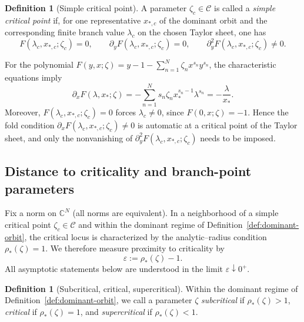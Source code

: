 \documentclass[11pt]{amsart}
\numberwithin{equation}{section}
\theoremstyle{plain}
\theoremstyle{definition}
\newtheorem{definition}[theorem]{Definition}
\theoremstyle{remark}
\newcommand{\CC}{\mathbb{C}}
\begin{document}
\begin{definition}[Simple critical point]\label{def:simple-critical}
	A parameter $\zeta_c\in\mathcal C$ is called a \emph{simple critical point}
	if, for one representative $x_{*,c}$ of the dominant
	orbit and the corresponding finite branch value $\lambda_c$ on the chosen Taylor
	sheet, one has
	\[
		F(\lambda_c,x_{*,c};\zeta_c)=0,
		\qquad
		\partial_yF(\lambda_c,x_{*,c};\zeta_c)=0,
		\qquad
		\partial_y^2F(\lambda_c,x_{*,c};\zeta_c)\neq0.
	\]
\end{definition}

For the polynomial $F(y,x;\zeta)=y-1-\sum_{n=1}^N \zeta_n x^{s_n}y^{s_n}$,
the characteristic equations imply
\[
	\partial_xF(\lambda,x_*;\zeta)=-\sum_{n=1}^N s_n\zeta_n x_*^{s_n-1}\lambda^{s_n}=-\frac{\lambda}{x_*}.
\]
Moreover, $F(\lambda_c,x_{*,c};\zeta_c)=0$ forces $\lambda_c\neq0$, since
$F(0,x;\zeta)=-1$. Hence the fold condition
$\partial_xF(\lambda_c,x_{*,c};\zeta_c)\neq0$ is automatic at a critical
point of the Taylor sheet, and only the nonvanishing of
$\partial_y^2F(\lambda_c,x_{*,c};\zeta_c)$ needs to be imposed.


\subsection{Distance to criticality and branch-point parameters}

Fix a norm on $\CC^N$ (all norms are equivalent).  In a neighborhood of a simple critical point $\zeta_c\in\mathcal C$
and within the dominant regime of Definition~\ref{def:dominant-orbit}, the critical locus is characterized by the analytic--radius condition
$\rho_*(\zeta)=1$.  We therefore measure proximity to criticality by
\begin{equation}\label{eq:eps-def}
	\varepsilon:=\rho_*(\zeta)-1.
\end{equation}
All asymptotic statements below are understood in the limit $\varepsilon\downarrow0^+$.

\begin{definition}[Subcritical, critical, supercritical]
\label{def:subcritical-critical-supercritical}
Within the dominant regime of Definition~\ref{def:dominant-orbit}, we call a
parameter \(\zeta\) \emph{subcritical} if \(\rho_*(\zeta)>1\),
\emph{critical} if \(\rho_*(\zeta)=1\), and \emph{supercritical} if
\(\rho_*(\zeta)<1\).
\end{definition}
\end{document}
